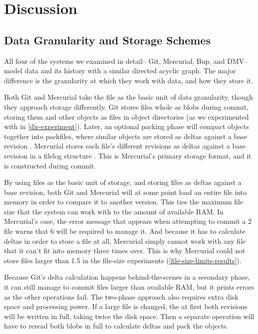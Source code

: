 \chapter{Discussion}


\section{Data Granularity and Storage Schemes}
\label{chunk-then-recombine}

All four of the systems we examined in detail-- Git, Mercurial, Bup, and
\gls{DMV}-- model data and its history with a similar directed acyclic graph.
The major difference is the granularity at which they work with data, and how
they store it.

Both Git and Mercurial take the file as the basic unit of data granularity,
though they approach storage differently. Git stores files whole as \glspl{blob}
during \gls{commit}, storing them and other objects as files in object
directories (as we experimented with in \autoref{dir-experiment}). Later, an
optional packing phase will compact objects together into \glspl{packfile},
where similar objects are stored as deltas against a base revision \cite[Section
10.4]{git_book}. Mercurial stores each file's different revisions as deltas
   against a base revision in a \gls{filelog} structure \cite[Chapter
   4]{hgbook}. This is Mercurial's primary storage format, and it is constructed
     during \gls{commit}.

By using files as the basic unit of storage, and storing files as deltas against
a base revision, both Git and Mercurial will at some point load an entire file
into memory in order to compare it to another version. This ties the maximum
file size that the system can work with to the amount of available RAM. In
Mercurial's case, the error message that appears when attempting to \gls{commit}
a \SI{2}{\gib} file warns that \SI{6}{\gib} will be required to manage it. And
because it has to calculate deltas in order to store a file at all, Mercurial
simply cannot work with any file that it can't fit into memory three times over.
This is why Mercurial could not store files larger than \SI{1.5}{\gib} in the
file-size experiments (\autoref{file-size-limits-results}).

Because Git's delta calculation happens behind-the-scenes in a secondary phase,
it can still manage to \gls{commit} files larger than available RAM, but it
prints errors as the other operations fail. The two-phase approach also requires
extra disk space and processing power. If a large file is changed, the at first
both revisions will be written in full, taking twice the disk space. Then a
separate operation will have to reread both \glspl{blob} in full to calculate
deltas and pack the objects.

